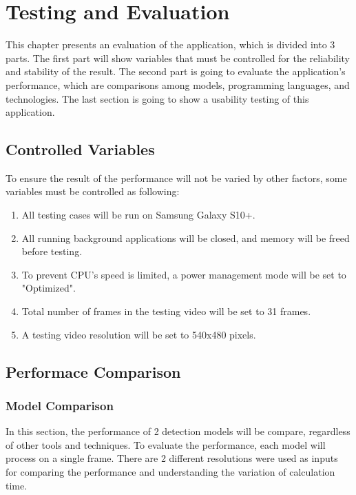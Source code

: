 \chapter{Testing and Evaluation}\label{testing}

    This chapter presents an evaluation of the application, which is divided into 3 parts.
    The first part will show variables that must be controlled for the reliability and stability of the result.
    The second part is going to evaluate the application's performance,
    which are comparisons among models, programming languages, and technologies.
    The last section is going to show a usability testing of this application.

    \section{Controlled Variables}
        To ensure the result of the performance will not be varied by other factors, some variables must be controlled as following:
        \begin{enumerate}
            \item All testing cases will be run on Samsung Galaxy S10+.
            \item All running background applications will be closed, and memory will be freed before testing.
            \item To prevent CPU's speed is limited, a power management mode will be set to "Optimized".
            \item Total number of frames in the testing video will be set to 31 frames.
            \item A testing video resolution will be set to 540x480 pixels.
        \end{enumerate}

    \section{Performace Comparison}
        \subsection{Model Comparison}
            In this section, the performance of 2 detection models will be compare, regardless of other tools and techniques.
            To evaluate the performance, each model will process on a single frame.
            There are 2 different resolutions were used as inputs for comparing the performance and understanding the variation of calculation time.

